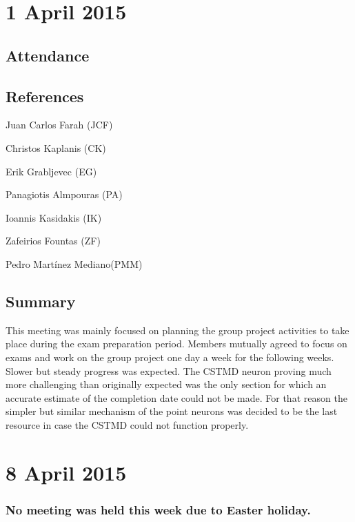 \documentclass[a4paper,11pt]{article}
\begin{document}
\section*{1 April 2015}
\subsection*{Attendance}
\begin{compactenum}\section{References}
\item Juan Carlos Farah (JCF)
\item Christos Kaplanis (CK)
\item Erik Grabljevec (EG)
\item Panagiotis Almpouras (PA)
\item Ioannis Kasidakis (IK)
\item Zafeirios Fountas (ZF)
\item Pedro Martínez Mediano(PMM)
\end{compactenum}

\subsection*{Summary}
This meeting was mainly focused on planning the group project activities to take place during the exam preparation period. Members mutually agreed to focus on exams and work on the group project one day a week for the following weeks. Slower but steady progress was expected.  The CSTMD neuron proving much more challenging than originally expected was the only section for which an accurate estimate of the completion date could not be made. For that reason the simpler but similar mechanism of the point neurons was decided to be the last resource in case the CSTMD could not function properly.

\maketitle
\section*{8 April 2015}
\subsubsection*{No meeting was held this week due to Easter holiday.}
\end{document}
